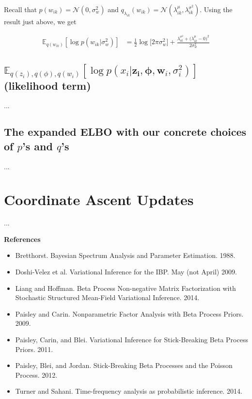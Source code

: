 \documentclass[11pt]{article}
\theoremstyle{definition}
\theoremstyle{plain}
\newcommand{\E}{\mathbb{E}}
\begin{document}
\noindent Recall that $p(w_{ik}) = \mathcal{N}(0, \sigma^2_w)$
and $q_{\lambda_{ik}}(w_{ik}) = 
\mathcal{N}(\lambda_{ik}^{\mu}, \lambda_{ik}^{\sigma^2})$. Using the result just
above, we get






\begin{align*}
    \E_{q(w_{ik})}[ \log p(w_{ik}|\sigma^2_w)] &=
    \frac{1}{2} \log \Big[2 \pi \sigma^2_{w} \Big]
              + \frac{\lambda_{ik}^{\sigma^2} 
              + \big(\lambda_{ik}^{\mu} - 0 \big)^2}{2 \sigma^2_{w}}
\end{align*}


\subsection{$\E_{q(z_i),q(\phi),q(w_i)}[\log p(x_i | \mathbf{z_i}, \boldsymbol{\phi}, \mathbf{w}_i, \sigma^2_i)]$ (likelihood term)}

...

\subsection{The expanded ELBO with our concrete choices of $p$'s and $q$'s}

...

\section{Coordinate Ascent Updates}

...


\begin{center} \textbf{References} \end{center}
    \begin{itemize}
        \item Bretthorst. Bayesian Spectrum Analysis and Parameter Estimation. 1988.
        \item Doshi-Velez et al. Variational Inference for the IBP. May (not April) 2009.
        \item Liang and Hoffman. Beta Process Non-negative Matrix Factorization with Stochastic Structured Mean-Field Variational Inference. 2014.
        \item Paisley and Carin. Nonparametric Factor Analysis with Beta Process Priors. 2009.
        \item Paisley, Carin, and Blei. Variational Inference for Stick-Breaking Beta Process Priors. 2011.
        \item Paisley, Blei, and Jordan. Stick-Breaking Beta Processes and the Poisson Process. 2012.
        \item Turner and Sahani. Time-frequency analysis as probabilistic inference. 2014. 
    \end{itemize}
\end{document}
